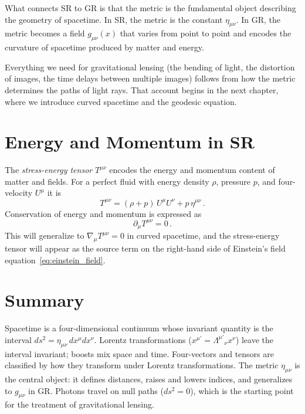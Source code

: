 What connects SR to GR is that the metric is the fundamental
object describing the geometry of spacetime.  In SR, the metric is the
constant $\eta_{\mu\nu}$.  In GR, the metric becomes a field
$g_{\mu\nu}(x)$ that varies from point to point and encodes the curvature of
spacetime produced by matter and energy.

Everything we need for gravitational lensing (the bending of light, the
distortion of images, the time delays between multiple images) follows
from how the metric determines the paths of light rays.
That account begins in the next chapter, where we introduce curved spacetime
and the geodesic equation.


\section{Energy and Momentum in SR}
\label{sec:energy_momentum_sr}

The \emph{stress-energy tensor} $T^{\mu\nu}$ encodes the energy and
momentum content of matter and fields.  For a perfect fluid with
energy density $\rho$, pressure $p$, and four-velocity $U^\mu$ it is
\begin{equation}
    T^{\mu\nu} = (\rho + p)\, U^\mu U^\nu + p\, \eta^{\mu\nu} \,.
    \label{eq:perfect_fluid}
\end{equation}
Conservation of energy and momentum is expressed as
\begin{equation}
    \partial_\mu T^{\mu\nu} = 0 \,.
    \label{eq:energy_conservation}
\end{equation}
This will generalize to $\nabla_\mu T^{\mu\nu} = 0$ in curved spacetime,
and the stress-energy tensor will appear as the source term on the
right-hand side of Einstein's field equation~\eqref{eq:einstein_field}.


\section{Summary}
\label{sec:sr_summary}

Spacetime is a four-dimensional continuum whose invariant quantity
is the interval $ds^2 = \eta_{\mu\nu}\, dx^\mu dx^\nu$.
Lorentz transformations ($x^{\mu'} = \Lambda^{\mu'}{}_\nu x^\nu$)
leave the interval invariant; boosts mix space and time.
Four-vectors and tensors are classified by how they transform
under Lorentz transformations.
The metric $\eta_{\mu\nu}$ is the central object: it defines
distances, raises and lowers indices, and generalizes to $g_{\mu\nu}$
in GR.
Photons travel on null paths ($ds^2 = 0$), which is the
starting point for the treatment of gravitational lensing.


